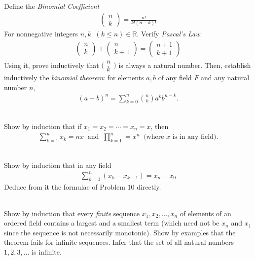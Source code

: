 \documentclass[12pt]{book}
\theoremstyle{definition}
\begin{document}
\begin{ex}[12]
\\
Define the \textit{Binomial Coefficient}
\begin{align*}
\begin{pmatrix}
	n \\
	k
\end{pmatrix}  = \frac{n!}{k!(n-k)!}	
\end{align*}
For nonnegative integers $n,k\;\; (k \leq n) \in \mathbb{R}$. Verify \textit{Pascal's Law}:
\begin{align*}
	\begin{pmatrix} n \\ k \end{pmatrix} + \begin{pmatrix} n \\ k+1 \end{pmatrix} = \begin{pmatrix}n+1 \\ k+1 \end{pmatrix}
\end{align*}
Using it, prove inductively that $\big(\begin{smallmatrix} n \\ k\end{smallmatrix} \big)$ is always a natural number. Then, establish inductively the \textit{binomial theorem}: for elements $a,b$ of any field $F$ and any natural number $n$,
\begin{align*}
	(a+b)^n = \sum_{k=0}^n \binom{n}{k} a^k b^{n-k}.
\end{align*}
\end{ex}
\begin{ex}[13]
\\
Show by induction that if $x_1 = x_2 = \cdots = x_n = x$, then
\begin{align*}
	\sum_{k=1}^n x_k = nx \;\; \text{and}\;\; \prod_{k=1}^n = x^n\;\; \text{(where $x$ is in any field).}  
\end{align*} 	
\end{ex}
\begin{ex}[14]
\\
Show by induction that in any field
\begin{align*}
	\sum_{k=1}^{n}(x_k-x_{k-1}) =x_n -x_0
\end{align*}	
Deduce from it the formulae of Problem 10 directly.
\end{ex}
\begin{ex}[15]
\\
Show by induction that every \textit{finite} sequence $x_1, x_2, \ldots, x_n$ of elements of an ordered field contains a largest and a smallest term (which need not be $x_n$ and $x_1$ since the sequence is not necessarily monotonic). Show by examples that the theorem fails for infinite sequences. Infer that the set of all natural numbers $1,2,3, \ldots$ is infinite.
\end{ex}
\end{document}
